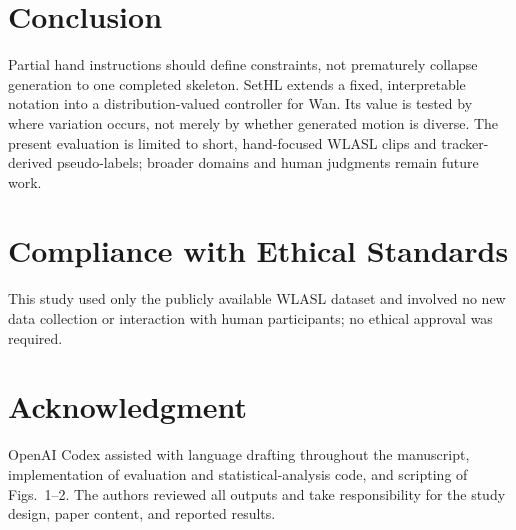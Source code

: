 \documentclass{article}
\begin{document}
\section{Conclusion}
Partial hand instructions should define constraints, not prematurely collapse
generation to one completed skeleton.  SetHL extends a fixed, interpretable
notation into a distribution-valued controller for Wan.  Its value is tested
by where variation occurs, not merely by whether generated motion is diverse.
The present evaluation is limited to short, hand-focused WLASL clips and
tracker-derived pseudo-labels; broader domains and human judgments remain
future work.

\section{Compliance with Ethical Standards}
This study used only the publicly available WLASL dataset and involved no new
data collection or interaction with human participants; no ethical approval
was required.

\section{Acknowledgment}
OpenAI Codex assisted with language drafting throughout the manuscript,
implementation of evaluation and statistical-analysis code, and scripting of
Figs.~1--2. The authors reviewed all outputs and take responsibility for the
study design, paper content, and reported results.



\end{document}
